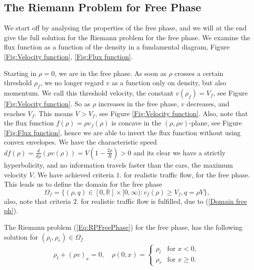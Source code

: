 \documentclass[10pt]{article}
\numberwithin{equation}{section}
\begin{document}
\subsection{The Riemann Problem for Free Phase}\label{RPFreePh}
We start off by analysing the properties of the free phase, and we will at the end give the full solution for the Riemann problem for the free phase. We examine the flux function as a function of the density in a fundamental diagram, Figure \ref{Fig:Velocity function}, \ref{Fig:Flux function}. 
\begin{figure} \centering 
   
\end{figure}
Starting in $\rho = 0$, we are in the free phase. As soon as $\rho$ crosses a certain threshold $\rho_f$, we no longer regard $v$ as a function only on density, but also momentum. We call this threshold velocity, the constant $v(\rho_f) = V_f$, see Figure \ref{Fig:Velocity function}. So as $\rho$ increases in the free phase,  $v$ decreases, and reaches $V_f$. This means $V > V_f $, see Figure \ref{Fig:Velocity function}. Also, note that the flux function $f(\rho) = \rho v_f(\rho) $ is concave in the $(\rho, \rho v)$-plane, see Figure \ref{Fig:Flux function}, hence we are able to invert the flux function without using convex envelopes. We have the characteristic speed $df(\rho) = \frac{d}{d\rho}(\rho v(\rho)) = V(1- \frac{2\rho}{R}) > 0$ and its clear we have a strictly hyperbolicity, and no information travels faster than the cars, the maximum velocity $V$. We have achieved criteria $1.$ for realistic traffic flow, for the free phase. This leads us to define the domain for the free phase \begin{equation}
    \Omega_f = \{(\rho, q) \in [0, \mathbb{R}] \times [0, \infty) : v_f(\rho) \geq V_f, q= \rho V \},
    \label{Domain free ph}
\end{equation} also, note that criteria $2.$ for realistic traffic flow is fulfilled, due to (\ref{Domain free ph}). 

The Riemann problem (\ref{Eq:RPFreePhase}) for the free phase, has the following solution for $(\rho_l, \rho_r) \in \Omega_f$
\begin{align}
    \rho_t + (\rho v)_x = 0,\quad  \rho(0,x) = \begin{cases} 
    \rho_l  & \text{for $x < 0$, }\\
    \rho_r  & \text{for $x \geq 0$.} 
    \end{cases}
    \label{Eq:RPFreePhase}
\end{align}
\end{document}
